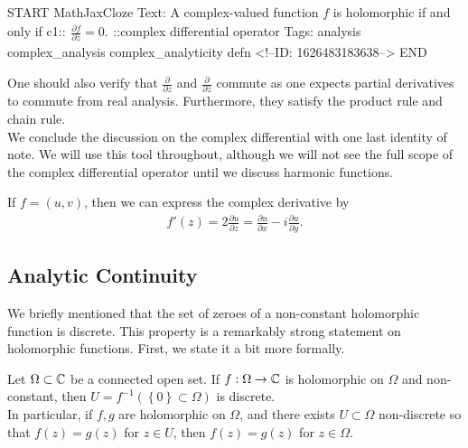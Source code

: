 \documentclass{memoir}
\begin{document}
\begin{anki}
START
MathJaxCloze
Text: A complex-valued function \(f\) is holomorphic if and only if
 {{c1::\(\begin{align*}
        	\frac{\partial f}{\partial \overline{z}} = 0.
        \end{align*}\)::complex differential operator}} 
Tags: analysis complex_analysis complex_analyticity defn
<!--ID: 1626483183638-->
END
\end{anki}


One should also verify that \(\frac{\partial }{\partial z} \) and \(\frac{\partial }{\partial \overline{z}} \) commute as one expects partial derivatives to commute from real analysis. Furthermore, they satisfy the product rule and chain rule.\\

We conclude the discussion on the complex differential with one last identity of note. We will use this tool throughout, although we will not see the full scope of the complex differential operator until we discuss harmonic functions.
\begin{prop}
If \(f = (u,v)\), then we can express the complex derivative by
\begin{align*}
	f'(z) = 2 \frac{\partial u}{\partial z} = \frac{\partial u}{\partial x} - i \frac{\partial u}{\partial y} .
\end{align*}
\end{prop}


\subsection{Analytic Continuity}
\label{sub:analytic_continuity}

We briefly mentioned that the set of zeroes of a non-constant holomorphic function is discrete. This property is a remarkably strong statement on holomorphic functions. First, we state it a bit more formally.

\begin{thm}
	Let \(\Omega \subset \mathbb{C}\) be a connected open set. If \(f:\Omega \to \mathbb{C}\) is holomorphic on \(\Omega \) and non-constant, then \(U = f^{-1}(\left\{ 0 \right\}\subset \Omega  )\) is discrete.\\

	In particular, if \(f,g\) are holomorphic on \(\Omega \), and there exists \(U\subset \Omega \) non-discrete so that \(f(z)=g(z)\) for \(z \in U\), then \(f(z)=g(z)\) for \(z \in \Omega \).
\end{thm}
\end{document}
